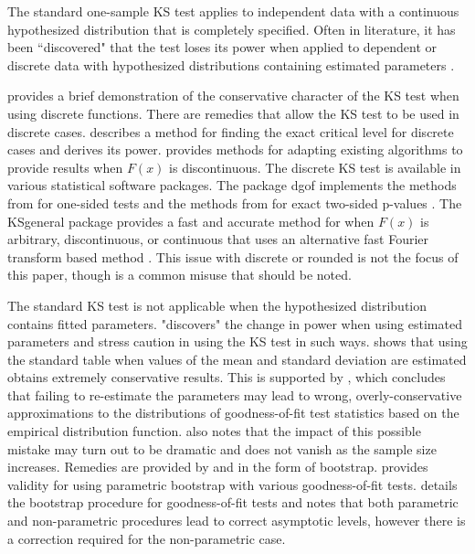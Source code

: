 \documentclass[12pt, letterpaper, titlepage]{article}
\begin{document}
The standard one-sample KS test applies to independent data with a continuous
hypothesized distribution that is completely specified. Often in literature, it 
has been ``discovered" that the test loses its power when applied to dependent 
or discrete data with hypothesized distributions containing estimated parameters 
\citep{Steinskog}. 

\citet{Noether} provides a brief demonstration of the 
conservative character of the KS test when using discrete functions. 
There are remedies that allow the KS test to be used in discrete cases. 
\citet{Conover} describes a method for finding the exact critical level for 
discrete cases and derives its power. \citet{Gleser} provides methods for 
adapting existing algorithms to provide results when $F(x)$ is discontinuous.
The discrete KS test is available in various statistical software packages.
The package \textsf{dgof} implements the methods from \citet{Conover} for 
one-sided tests and the methods from \citet{Gleser} for exact two-sided 
p-values \citep{Arnold}. The \textsf{KSgeneral} package provides a fast and 
accurate method for when $F(x)$ is arbitrary, discontinuous, or continuous that 
uses an alternative fast Fourier transform based method \citep{Dimitrova}.
This issue with discrete or rounded is not the focus of this paper, though is a
common misuse that should be noted.

The standard KS test is not applicable when the hypothesized distribution 
contains fitted parameters. \citet{Steinskog} "discovers" the change in power 
when using estimated parameters and stress caution in using the KS test in such 
ways. \citet{Lilliefors} shows that using the standard table when values of the 
mean and standard deviation are estimated obtains extremely conservative 
results. This is supported by \citet{Capasso}, which concludes that failing to 
re-estimate the parameters may lead to wrong, overly-conservative approximations 
to the distributions of goodness-of-fit test statistics based on the empirical 
distribution function. \citet{Capasso} also notes that the impact of this 
possible mistake may turn out to be dramatic and does not vanish as the sample 
size increases. Remedies are provided by \citet{Genest} and \citet{Babu} in the 
form of bootstrap. \citet{Genest} provides validity for using parametric 
bootstrap with various goodness-of-fit tests. \citet{Babu} details the bootstrap
procedure for goodness-of-fit tests and notes that both parametric and 
non-parametric procedures lead to correct asymptotic levels, however there 
is a correction required for the non-parametric case. 
\end{document}
